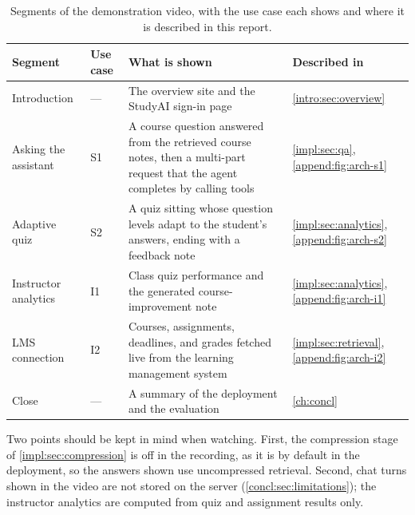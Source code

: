 \makeatletter\setlength{\@fptop}{0pt}\makeatother
\begin{table}[htb]
  \centering
  \caption{Segments of the demonstration video, with the use case each shows
           and where it is described in this report.}
  \label{append:tab:demo}
  \footnotesize
  \renewcommand{\arraystretch}{1.3}
  \begin{tabular}{L{0.18\textwidth} L{0.10\textwidth} L{0.42\textwidth} L{0.20\textwidth}}
    \hline
    \textbf{Segment} & \textbf{Use case} & \textbf{What is shown} & \textbf{Described in} \\
    \hline
    Introduction & --- &
      The overview site and the StudyAI sign-in page &
      \autoref{intro:sec:overview} \\
    Asking the assistant & S1 &
      A course question answered from the retrieved course notes, then a
      multi-part request that the agent completes by calling tools &
      \autoref{impl:sec:qa}, \autoref{append:fig:arch-s1} \\
    Adaptive quiz & S2 &
      A quiz sitting whose question levels adapt to the student's answers,
      ending with a feedback note &
      \autoref{impl:sec:analytics}, \autoref{append:fig:arch-s2} \\
    Instructor analytics & I1 &
      Class quiz performance and the generated course-improvement note &
      \autoref{impl:sec:analytics}, \autoref{append:fig:arch-i1} \\
    LMS connection & I2 &
      Courses, assignments, deadlines, and grades fetched live from the
      learning management system &
      \autoref{impl:sec:retrieval}, \autoref{append:fig:arch-i2} \\
    Close & --- &
      A summary of the deployment and the evaluation &
      \autoref{ch:concl} \\
    \hline
  \end{tabular}
\end{table}

Two points should be kept in mind when watching. First, the compression stage
of \autoref{impl:sec:compression} is off in the recording, as it is by
default in the deployment, so the answers shown use uncompressed retrieval.
Second, chat turns shown in the video are not stored on the server
(\autoref{concl:sec:limitations}); the instructor analytics are computed from
quiz and assignment results only.
